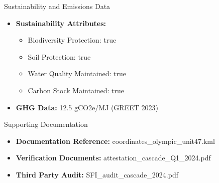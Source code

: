 \documentclass{beamer}
\begin{document}
\begin{frame}{Sustainability and Emissions Data}
\begin{itemize}
  \item \textbf{Sustainability Attributes:}
    \begin{itemize}
      \item Biodiversity Protection: true
      \item Soil Protection: true
      \item Water Quality Maintained: true
      \item Carbon Stock Maintained: true
    \end{itemize}
  \item \textbf{GHG Data:} 12.5 gCO2e/MJ (GREET 2023)
\end{itemize}
\end{frame}

\begin{frame}{Supporting Documentation}
\begin{itemize}
  \item \textbf{Documentation Reference:} coordinates\_olympic\_unit47.kml
  \item \textbf{Verification Documents:} attestation\_cascade\_Q1\_2024.pdf
  \item \textbf{Third Party Audit:} SFI\_audit\_cascade\_2024.pdf
\end{itemize}
\end{frame}
\end{document}
